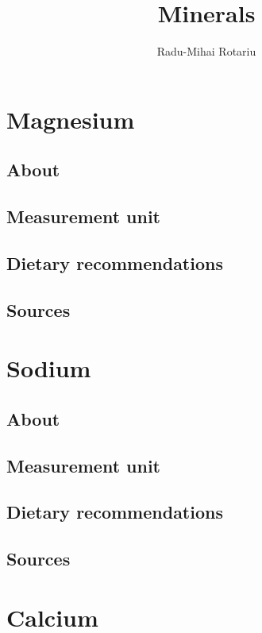 \documentclass{book}
\begin{document}
\title{Minerals}
\author{Radu-Mihai Rotariu}
\maketitle

\tableofcontents
\chapter{Magnesium}
\section{About}


\section{Measurement unit}


\section{Dietary recommendations}


\section{Sources}


\chapter{Sodium}
\section{About}


\section{Measurement unit}


\section{Dietary recommendations}


\section{Sources}


\chapter{Calcium}
\end{document}
